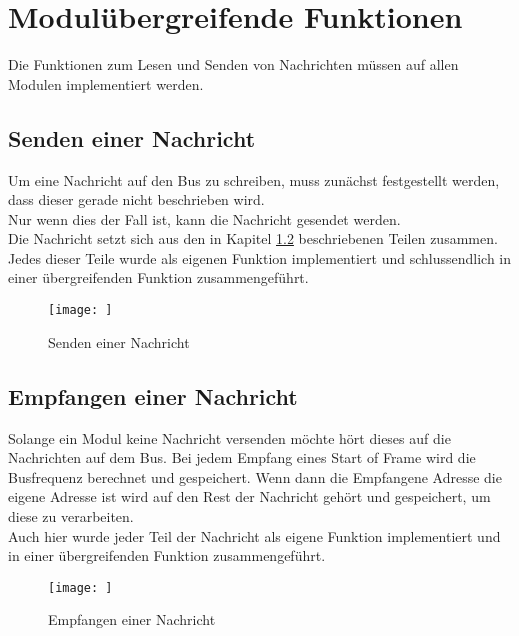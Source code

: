 \section{Modulübergreifende Funktionen}
\textmd{Die Funktionen zum Lesen und Senden von Nachrichten müssen auf allen Modulen implementiert werden.\\
}
\subsection{Senden einer Nachricht}
\textmd{Um eine Nachricht auf den Bus zu schreiben, muss zunächst festgestellt werden, dass dieser gerade nicht beschrieben wird.\\
Nur wenn dies der Fall ist, kann die Nachricht gesendet werden. \\
Die Nachricht setzt sich aus den in Kapitel \ref{} beschriebenen Teilen zusammen. Jedes dieser Teile wurde als eigenen Funktion implementiert und schlussendlich in einer übergreifenden Funktion zusammengeführt.\\
}
\begin{figure}[H]
    \centering    
    \texttt{[image: ]}
    \caption{Senden einer Nachricht}
    \label{send()}
\end{figure}

\subsection{Empfangen einer Nachricht}
\textmd{Solange ein Modul keine Nachricht versenden möchte hört dieses auf die Nachrichten auf dem Bus. Bei jedem Empfang eines Start of Frame wird die Busfrequenz berechnet und gespeichert. Wenn dann die Empfangene Adresse die eigene Adresse ist wird auf den Rest der Nachricht gehört und gespeichert, um diese zu verarbeiten.\\
Auch hier wurde jeder Teil der Nachricht als eigene Funktion implementiert und in einer übergreifenden Funktion zusammengeführt.
}
\begin{figure}[H]
    \centering    
    \texttt{[image: ]}
    \caption{Empfangen einer Nachricht}
    \label{recieve()}
\end{figure}





